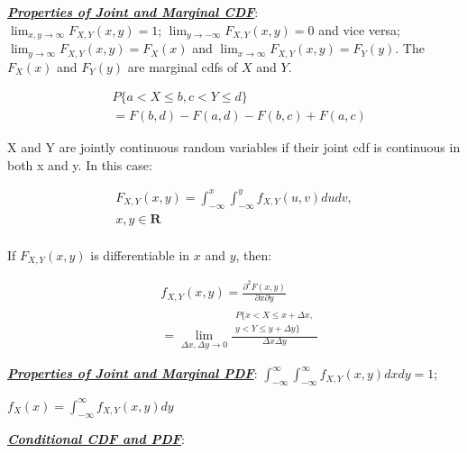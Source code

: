 \documentclass[12pt]{article}
\newcommand{\bulletPoint}[1]{\ul{\textit{\textbf{#1}}}}
\begin{document}
\begin{multicols*}{4}
\bulletPoint{Properties of Joint and Marginal CDF}:\\
$\lim_{x,y\rightarrow\infty} F_{X,Y}(x,y) = 1$; $\lim_{y\rightarrow - \infty} F_{X,Y}(x,y)=0$ and vice versa; $\lim_{y \rightarrow \infty} F_{X,Y}(x,y) = F_X(x)$ and $\lim_{x \rightarrow \infty} F_{X,Y}(x,y) = F_Y(y)$. The $F_X(x)$ and $F_Y(y)$ are marginal cdfs of $X$ and $Y$.

\useshortskip \begin{equation*}
\begin{split}
    & P\{ a < X \leq b, c < Y \leq d \} \\
    & = F(b,d) - F(a,d) - F(b,c) + F(a,c)
\end{split}
\end{equation*}

X and Y are jointly continuous random variables if their joint cdf is continuous in both x and y. In this case:

\useshortskip \begin{equation*}
\begin{split}
    F_{X,Y}(x,y) = \int^x_{-\infty} \int^y_{- \infty} f_{X,Y}(u,v) dudv, \\[-7pt]
    x,y \in \textbf{R}\\[-5pt]
\end{split}
\end{equation*}

If $F_{X,Y}(x,y)$ is differentiable in $x$ and $y$, then: 

\useshortskip \begin{equation*}
    \begin{split}
        & f_{X,Y}(x,y) = \frac{\partial^2F(x,y)}{\partial x \partial y} \\
        & = \lim_{\Delta x, \Delta y \rightarrow 0} \frac{
        \begin{split}
            P\{ x < X \leq x+\Delta x,\\
            y < Y \leq y+\Delta y\}
        \end{split}
        }{\Delta x \Delta y} 
    \end{split}
\end{equation*}


\bulletPoint{Properties of Joint and Marginal PDF}:
$\int^{\infty}_{-\infty} \int^{\infty}_{-\infty} f_{X,Y}(x,y) dxdy= 1$; 

$f_X(x) = \int^{\infty}_{-\infty}f_{X,Y}(x,y)dy$


\bulletPoint{Conditional CDF and PDF}:


\end{multicols*}
\end{document}
